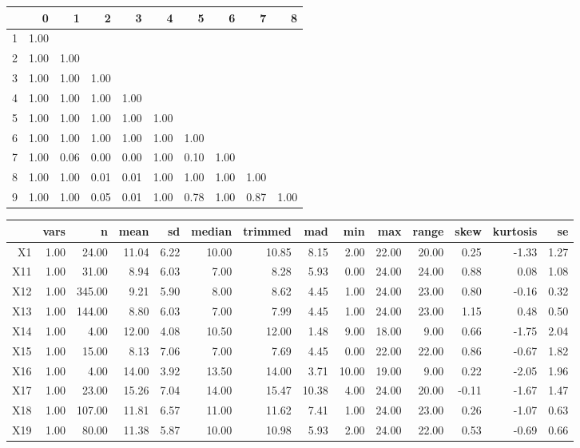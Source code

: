 % 
\begin{tabular}{rrrrrrrrrr}
  \hline
 & 0 & 1 & 2 & 3 & 4 & 5 & 6 & 7 & 8 \\ 
  \hline
1 & 1.00 &  &  &  &  &  &  &  &  \\ 
  2 & 1.00 & 1.00 &  &  &  &  &  &  &  \\ 
  3 & 1.00 & 1.00 & 1.00 &  &  &  &  &  &  \\ 
  4 & 1.00 & 1.00 & 1.00 & 1.00 &  &  &  &  &  \\ 
  5 & 1.00 & 1.00 & 1.00 & 1.00 & 1.00 &  &  &  &  \\ 
  6 & 1.00 & 1.00 & 1.00 & 1.00 & 1.00 & 1.00 &  &  &  \\ 
  7 & 1.00 & 0.06 & 0.00 & 0.00 & 1.00 & 0.10 & 1.00 &  &  \\ 
  8 & 1.00 & 1.00 & 0.01 & 0.01 & 1.00 & 1.00 & 1.00 & 1.00 &  \\ 
  9 & 1.00 & 1.00 & 0.05 & 0.01 & 1.00 & 0.78 & 1.00 & 0.87 & 1.00 \\ 
   \hline
\end{tabular}
% 
\begin{tabular}{rrrrrrrrrrrrrr}
  \hline
 & vars & n & mean & sd & median & trimmed & mad & min & max & range & skew & kurtosis & se \\ 
  \hline
X1 & 1.00 & 24.00 & 11.04 & 6.22 & 10.00 & 10.85 & 8.15 & 2.00 & 22.00 & 20.00 & 0.25 & -1.33 & 1.27 \\ 
  X11 & 1.00 & 31.00 & 8.94 & 6.03 & 7.00 & 8.28 & 5.93 & 0.00 & 24.00 & 24.00 & 0.88 & 0.08 & 1.08 \\ 
  X12 & 1.00 & 345.00 & 9.21 & 5.90 & 8.00 & 8.62 & 4.45 & 1.00 & 24.00 & 23.00 & 0.80 & -0.16 & 0.32 \\ 
  X13 & 1.00 & 144.00 & 8.80 & 6.03 & 7.00 & 7.99 & 4.45 & 1.00 & 24.00 & 23.00 & 1.15 & 0.48 & 0.50 \\ 
  X14 & 1.00 & 4.00 & 12.00 & 4.08 & 10.50 & 12.00 & 1.48 & 9.00 & 18.00 & 9.00 & 0.66 & -1.75 & 2.04 \\ 
  X15 & 1.00 & 15.00 & 8.13 & 7.06 & 7.00 & 7.69 & 4.45 & 0.00 & 22.00 & 22.00 & 0.86 & -0.67 & 1.82 \\ 
  X16 & 1.00 & 4.00 & 14.00 & 3.92 & 13.50 & 14.00 & 3.71 & 10.00 & 19.00 & 9.00 & 0.22 & -2.05 & 1.96 \\ 
  X17 & 1.00 & 23.00 & 15.26 & 7.04 & 14.00 & 15.47 & 10.38 & 4.00 & 24.00 & 20.00 & -0.11 & -1.67 & 1.47 \\ 
  X18 & 1.00 & 107.00 & 11.81 & 6.57 & 11.00 & 11.62 & 7.41 & 1.00 & 24.00 & 23.00 & 0.26 & -1.07 & 0.63 \\ 
  X19 & 1.00 & 80.00 & 11.38 & 5.87 & 10.00 & 10.98 & 5.93 & 2.00 & 24.00 & 22.00 & 0.53 & -0.69 & 0.66 \\ 
   \hline
\end{tabular}
